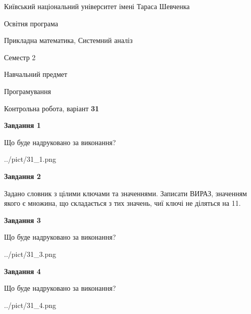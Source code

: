 \documentclass[12pt, ukrainian]{article}
\begin{document}
{{\begin {small}\par
{ \center  Київський національний університет імені Тараса Шевченка \par}
{\parbox {5 cm}{Освітня програма \hfill}{\parbox {8 cm}{Прикладна математика, Системний аналіз \hfill}}\parbox {5 cm}{\hfill Семестр 2}}\par
{\parbox {5 cm} {Навчальний предмет \hfill}\parbox {7 cm}{Програмування \hfill}\parbox {6cm}{\hfill}\par}\vspace{-7pt} \end{small}}{\center Контрольна робота, варіант  \No \textbf
{ 31 }\par}}
{
\begin {large}
{\begin {center}\textbf{Завдання 1}\end {center}}\par
Що буде надруковано за виконання?\par\par
\begin{center}
	{../pict/31_1.png}
\end{center}
\newpage

{\begin {center}\textbf{Завдання 2}\end {center}}\par
Задано словник  з цілими ключами та значеннями. Записати ВИРАЗ, значенням якого є множина, що складається  з тих значень, чиї ключі не діляться на 11.\par
\newpage

{\begin {center}\textbf{Завдання 3}\end {center}}\par
Що буде надруковано за виконання?
\begin{center}
	{../pict/31_3.png}
\end{center}
\newpage

{\begin {center}\textbf{Завдання 4}\end {center}}\par
Що буде надруковано за виконання?\par
\begin{center}
	{../pict/31_4.png}
\end{center}
\newpage


\end{large}}
\end{document}
